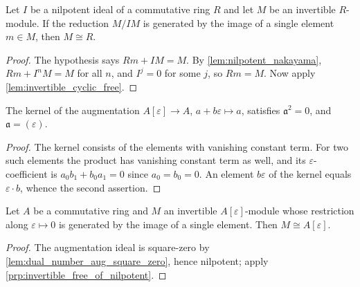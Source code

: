 \begin{proposition}\leanok
  \label{prp:invertible_free_of_nilpotent}
  Let \(I\) be a nilpotent ideal of a commutative ring \(R\) and let \(M\) be
  an invertible \(R\)-module. If the reduction \(M/IM\) is generated by the
  image of a single element \(m \in M\), then \(M \cong R\).
\end{proposition}

\begin{proof}\leanok
  The hypothesis says \(Rm + IM = M\). By
  \cref{lem:nilpotent_nakayama}, \(Rm + I^{n}M = M\) for all \(n\), and
  \(I^{j} = 0\) for some \(j\), so \(Rm = M\). Now apply
  \cref{lem:invertible_cyclic_free}.
\end{proof}

\begin{lemma}\leanok
  \label{lem:dual_number_aug_square_zero}
  The kernel of the augmentation \(A[\varepsilon] \to A\),
  \(a + b\varepsilon \mapsto a\), satisfies \(\mathfrak{a}^{2} = 0\), and
  \(\mathfrak{a} = (\varepsilon)\).
\end{lemma}

\begin{proof}\leanok
  The kernel consists of the elements with vanishing constant term. For two
  such elements the product has vanishing constant term as well, and its
  \(\varepsilon\)-coefficient is
  \(a_{0}b_{1} + b_{0}a_{1} = 0\) since \(a_{0} = b_{0} = 0\). An element
  \(b\varepsilon\) of the kernel equals \(\varepsilon \cdot b\), whence the
  second assertion.
\end{proof}

\begin{corollary}\leanok
  \label{cor:dual_number_chart_triviality}
  Let \(A\) be a commutative ring and \(M\) an invertible
  \(A[\varepsilon]\)-module whose restriction along \(\varepsilon \mapsto 0\)
  is generated by the image of a single element. Then \(M \cong
  A[\varepsilon]\).
\end{corollary}

\begin{proof}\leanok
  The augmentation ideal is square-zero by
  \cref{lem:dual_number_aug_square_zero}, hence nilpotent; apply
  \cref{prp:invertible_free_of_nilpotent}.
\end{proof}

